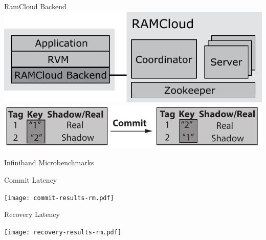 \documentclass{beamer}
\begin{document}
\begin{frame}{RamCloud Backend}
    \centering
    \includegraphics[scale=0.7]{ramcloud_backend_design_final.pdf}
    \vspace{2em}
    \includegraphics[scale=0.7]{ramcloud_backend_commit.pdf}
\end{frame}

\begin{frame}{Infiniband Microbenchmarks}
    \centering
    \begin{minipage}{0.45\textwidth}
        \centering
        Commit Latency

        \texttt{[image: commit-results-rm.pdf]}
    \end{minipage}
    \begin{minipage}{0.45\textwidth}
        \centering
        Recovery Latency

        \texttt{[image: recovery-results-rm.pdf]}
    \end{minipage}
\end{frame}
\end{document}
